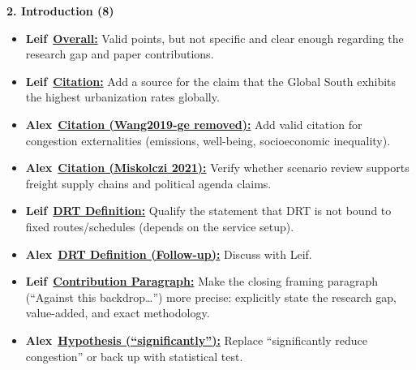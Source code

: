 \documentclass[preprint,12pt,authoryear]{elsarticle}
\newcommand{\todobadge}[2]{\colorbox{#1}{\textbf{\scriptsize #2}}}
\newcommand{\badgeLeif}{\todobadge{yellow!40}{Leif}}
\newcommand{\badgeAlex}{\todobadge{blue!25}{Alex}}
\begin{document}
\noindent\textbf{2. Introduction (8)}
\begin{itemize}\setlength{\itemsep}{1pt}\setlength{\parskip}{0pt}\setlength{\parsep}{0pt}
  \item[$\square$] \badgeLeif\ \hyperlink{todo:intro-overall}{\textbf{Overall:}} Valid points, but not specific and clear enough regarding the research gap and paper contributions.
  \item[$\square$] \badgeLeif\ \hyperlink{todo:intro-source}{\textbf{Citation:}} Add a source for the claim that the Global South exhibits the highest urbanization rates globally.
  \item[$\square$] \badgeAlex\ \hyperlink{todo:intro-cite-wang}{\textbf{Citation (Wang2019-ge removed):}} Add valid citation for congestion externalities (emissions, well-being, socioeconomic inequality).
  \item[$\square$] \badgeAlex\ \hyperlink{todo:intro-cite-miskolczi}{\textbf{Citation (Miskolczi 2021):}} Verify whether scenario review supports freight supply chains and political agenda claims.
  \item[$\square$] \badgeLeif\ \hyperlink{todo:intro-drt-setup}{\textbf{DRT Definition:}} Qualify the statement that DRT is not bound to fixed routes/schedules (depends on the service setup).
  \item[$\square$] \badgeAlex\ \hyperlink{todo:intro-drt-setup-alex}{\textbf{DRT Definition (Follow-up):}} Discuss with Leif.
  \item[$\square$] \badgeLeif\ \hyperlink{todo:intro-gap}{\textbf{Contribution Paragraph:}} Make the closing framing paragraph (``Against this backdrop\dots'') more precise: explicitly state the research gap, value-added, and exact methodology.
  \item[$\square$] \badgeAlex\ \hyperlink{todo:intro-sig}{\textbf{Hypothesis (``significantly''):}} Replace ``significantly reduce congestion'' or back up with statistical test.
\end{itemize}
\end{document}

